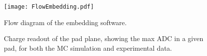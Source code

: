 





\begin{figure}[!htb]
\centering
\texttt{[image: FlowEmbedding.pdf]}
\caption{Flow diagram of the embedding software.}
\label{fig:flow}
\end{figure}


\begin{figure}[!htb]%
    \centering
    \qquad
    \caption{Charge readout of the pad plane, showing the max ADC in a given pad, for both the MC simulation and experimental data.}
	\label{fig:mcDataEmbedtrack}
\end{figure}


